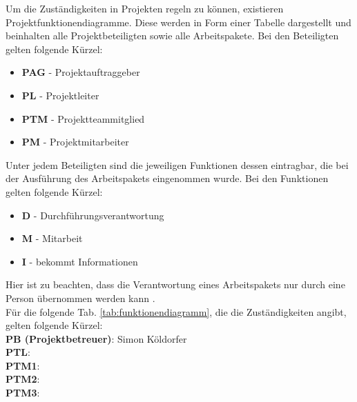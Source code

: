 Um die Zuständigkeiten in Projekten regeln zu können, existieren Projektfunktionendiagramme. Diese werden in Form einer Tabelle dargestellt und beinhalten alle Projektbeteiligten sowie alle Arbeitspakete. Bei den Beteiligten gelten folgende Kürzel:
\begin{itemize}
	\item \textbf{PAG} - Projektauftraggeber
	\item \textbf{PL} - Projektleiter
	\item \textbf{PTM} - Projektteammitglied
	\item \textbf{PM} - Projektmitarbeiter
\end{itemize}
Unter jedem Beteiligten sind die jeweiligen Funktionen dessen eintragbar, die bei der Ausführung des Arbeitspakets eingenommen wurde.
Bei den Funktionen gelten folgende Kürzel:
\begin{itemize}
	\item \textbf{D} - Durchführungsverantwortung
	\item \textbf{M} - Mitarbeit
	\item \textbf{I} - bekommt Informationen
\end{itemize}
Hier ist zu beachten, dass die Verantwortung eines Arbeitspakets nur durch eine Person übernommen werden kann \cite[vgl.][]{prezi:o.J.}. \\
Für die folgende Tab. \ref{tab:funktionendiagramm}, die die Zuständigkeiten angibt, gelten folgende Kürzel: \\ 
\textbf{PB (Projektbetreuer)}: Simon Köldorfer \\\textbf{PTL}: \mangeng \\\textbf{PTM1}: \pezze \\\textbf{PTM2}: \fenkart \\\textbf{PTM3}: \schneider

